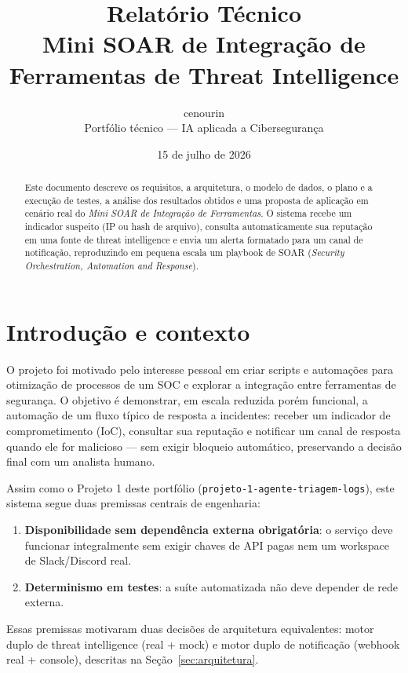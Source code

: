\documentclass[11pt,a4paper]{article}
\title{\textbf{Relatório Técnico}\\[4pt]
\large Mini SOAR de Integração de Ferramentas de Threat Intelligence}
\author{cenourin \\ \small Portfólio técnico --- IA aplicada a Cibersegurança}
\date{15 de julho de 2026}
\begin{document}
\maketitle

\begin{abstract}
\noindent Este documento descreve os requisitos, a arquitetura, o modelo de dados, o
plano e a execução de testes, a análise dos resultados obtidos e uma proposta de
aplicação em cenário real do \emph{Mini SOAR de Integração de Ferramentas}. O sistema
recebe um indicador suspeito (IP ou hash de arquivo), consulta automaticamente sua
reputação em uma fonte de threat intelligence e envia um alerta formatado para um canal
de notificação, reproduzindo em pequena escala um playbook de SOAR (\emph{Security
Orchestration, Automation and Response}).
\end{abstract}

\tableofcontents

\section{Introdução e contexto}

O projeto foi motivado pelo interesse pessoal em criar scripts e automações para
otimização de processos de um SOC e explorar a integração entre ferramentas de
segurança. O objetivo é demonstrar, em escala reduzida porém funcional, a automação de
um fluxo típico de resposta a incidentes: receber um
indicador de comprometimento (IoC), consultar sua reputação e notificar um canal de
resposta quando ele for malicioso --- sem exigir bloqueio automático, preservando a
decisão final com um analista humano.

Assim como o Projeto 1 deste portfólio (\texttt{projeto-1-agente-triagem-logs}), este
sistema segue duas premissas centrais de engenharia:

\begin{enumerate}
  \item \textbf{Disponibilidade sem dependência externa obrigatória}: o serviço deve
  funcionar integralmente sem exigir chaves de API pagas nem um workspace de
  Slack/Discord real.
  \item \textbf{Determinismo em testes}: a suíte automatizada não deve depender de
  rede externa.
\end{enumerate}

Essas premissas motivaram duas decisões de arquitetura equivalentes: motor duplo de
threat intelligence (real + mock) e motor duplo de notificação (webhook real +
console), descritas na Seção~\ref{sec:arquitetura}.
\end{document}
